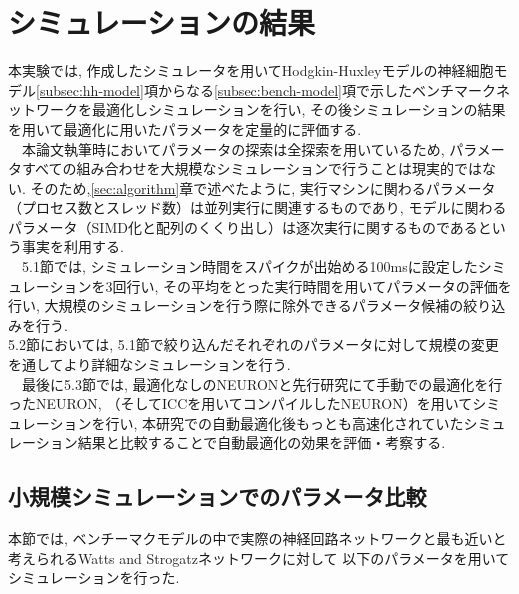 \section{シミュレーションの結果}
\label{sec:sim-result}
本実験では, 作成したシミュレータを用いてHodgkin-Huxleyモデルの神経細胞モデル\ref{subsec:hh-model}項からなる\ref{subsec:bench-model}項で示したベンチマークネットワークを最適化しシミュレーションを行い,
その後シミュレーションの結果を用いて最適化に用いたパラメータを定量的に評価する.\\
　本論文執筆時においてパラメータの探索は全探索を用いているため, パラメータすべての組み合わせを大規模なシミュレーションで行うことは現実的ではない.
そのため,\ref{sec:algorithm}章で述べたように, 実行マシンに関わるパラメータ（プロセス数とスレッド数）は並列実行に関連するものであり,
モデルに関わるパラメータ（SIMD化と配列のくくり出し）は逐次実行に関するものであるという事実を利用する.\\
　5.1節では, シミュレーション時間をスパイクが出始める100msに設定したシミュレーションを3回行い,
その平均をとった実行時間を用いてパラメータの評価を行い, 大規模のシミュレーションを行う際に除外できるパラメータ候補の絞り込みを行う.\\
5.2節においては, 5.1節で絞り込んだそれぞれのパラメータに対して規模の変更を通してより詳細なシミュレーションを行う.\\
　最後に5.3節では, 最適化なしのNEURONと先行研究にて手動での最適化を行ったNEURON, （そしてICCを用いてコンパイルしたNEURON）を用いてシミュレーションを行い,
本研究での自動最適化後もっとも高速化されていたシミュレーション結果と比較することで自動最適化の効果を評価・考察する.\\

\subsection{小規模シミュレーションでのパラメータ比較}
\label{subsec:small-sim}
本節では, ベンチーマクモデルの中で実際の神経回路ネットワークと最も近いと考えられるWatts and Strogatzネットワークに対して
以下のパラメータを用いてシミュレーションを行った.\\
